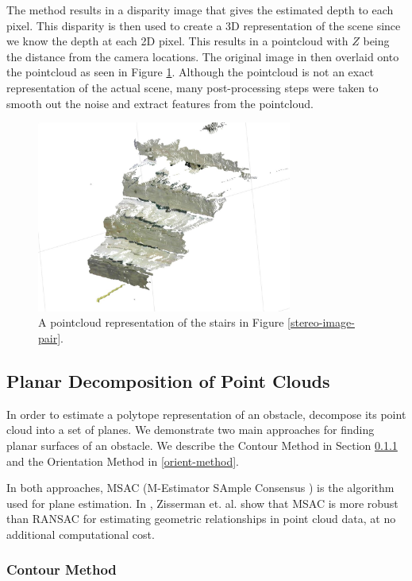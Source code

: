 The method results in a disparity image that gives the estimated depth to each pixel. This disparity is then used to create a 3D representation of the scene since we know the depth at each 2D pixel. This results in a pointcloud with $Z$ being the distance from the camera locations. The original image in then overlaid onto the pointcloud as seen in Figure \ref{pointcloud-example}. Although the pointcloud is not an exact representation of the actual scene, many post-processing steps were taken to smooth out the noise and extract features from the pointcloud.
\begin{figure}[!h]
\centering
\includegraphics[width=3.3in]{Sections/Figures/example_stairs_pointcloud.jpg}
\caption{A pointcloud representation of the stairs in Figure \ref{stereo-image-pair}.}
\label{pointcloud-example}
\end{figure}

\subsection{Planar Decomposition of Point Clouds} \label{plane-section}

In order to estimate a polytope representation of an obstacle, decompose its point cloud into a set of planes. We demonstrate two main approaches for finding planar surfaces of an obstacle. We describe the Contour Method in Section \ref{contour-method} and the Orientation Method in \ref{orient-method}.

In both approaches, MSAC (M-Estimator SAmple Consensus \cite{msac-article}) is the algorithm used for plane estimation. In \cite{msac-article}, Zisserman et. al. show that MSAC is more robust than RANSAC for estimating geometric relationships in point cloud data, at no additional computational cost.

\subsubsection{Contour Method} \label{contour-method}

